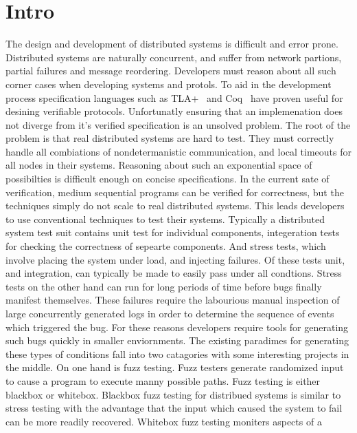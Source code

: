 \section{Intro}
\label{sec:intro}

The design and development of distributed systems is difficult and error prone.
Distributed systems are naturally concurrent, and suffer from network partions,
partial failures and message reordering. Developers must reason about all such
corner cases when developing systems and protols. To aid in the development
process specification languages such as TLA+~\cite{} and Coq~\cite{} have
proven useful for desining verifiable protocols. Unfortunatly ensuring that an
implemenation does not diverge from it's verified specification is an unsolved
problem. The root of the problem is that real distributed systems are hard to
test. They must correctly handle all combiations of nondetermanistic
communication, and local timeouts for all nodes in their systems. Reasoning
about such an exponential space of possibilties is difficult enough on concise
specifications. In the current sate of verification, medium sequential programs
can be verified for correctness, but the techniques simply do not scale to real
distributed systems. This leads developers to use conventional techniques to
test their systems. Typically a distributed system test suit contains unit test
for individual components, integeration tests for checking the correctness of
sepearte components. And stress tests, which involve placing the system under
load, and injecting failures. Of these tests unit, and integration, can
typically be made to easily pass under all condtions. Stress tests on the other
hand can run for long periods of time before bugs finally manifest themselves.
These failures require the labourious manual inspection of large concurrently
generated logs in order to determine the sequence of events which triggered the
bug. For these reasons developers require tools for generating such bugs
quickly in smaller enviornments. The existing paradimes for generating these
types of conditions fall into two catagories with some interesting projects in
the middle. On one hand is fuzz testing. Fuzz testers generate randomized input
to cause a program to execute manny possible paths. Fuzz testing is either
blackbox or whitebox. Blackbox fuzz testing for distribued systems is similar
to stress testing with the advantage that the input which caused the system to
fail can be more readily recovered. Whitebox fuzz testing moniters aspects of a
